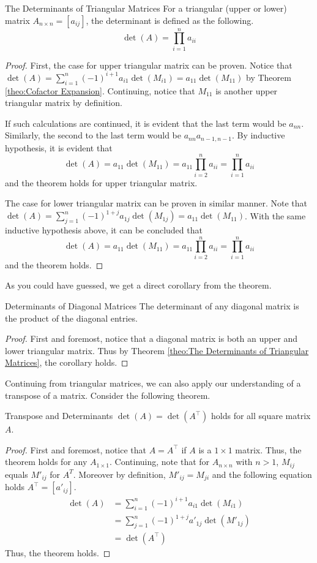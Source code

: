 \documentclass[../main.tex]{subfiles}
\begin{document}
\begin{theorem}{The Determinants of Triangular Matrices}
For a triangular (upper or lower) matrix $A_{n \times n} = [a_{ij}]$,
the determinant is defined as the following.
\[
\det(A)
= \prod_{i=1}^n a_{ii}
\]
\end{theorem}
\begin{proof}
First, the case for upper triangular matrix can be proven. Notice that
$\det(A) = \sum_{i=1}^n (-1)^{i + 1} a_{i1} \det(M_{i1}) =
a_{11} \det(M_{11})$ by Theorem \ref{theo:Cofactor Expansion}.
Continuing, notice that $M_{11}$ is another upper triangular matrix
by definition.

If such calculations are continued, it is evident that the last
term would be $a_{nn}$. Similarly, the second to the last term
would be $a_{nn} a_{n-1,n-1}$. By inductive hypothesis, it is
evident that
\[
\det(A)
= a_{11} \det(M_{11})
= a_{11} \prod_{i=2}^n a_{ii}
= \prod_{i=1}^n a_{ii}
\]
and the theorem holds for upper triangular matrix.

The case for lower triangular matrix can be proven in similar
manner. Note that $\det(A) = \sum_{j=1}^n (-1)^{1 + j} a_{1j}
\det(M_{1j}) = a_{11} \det(M_{11})$. With the same inductive
hypothesis above, it can be concluded that
\[
\det(A)
= a_{11} \det(M_{11})
= a_{11} \prod_{i=2}^n a_{ii}
= \prod_{i=1}^n a_{ii}
\]
and the theorem holds.
\end{proof}

As you could have guessed, we get a direct corollary from the
theorem.

\begin{corollary}{Determinants of Diagonal Matrices}
The determinant of any diagonal matrix is the product of the
diagonal entries.
\end{corollary}
\begin{proof}
First and foremost, notice that a diagonal matrix is both
an upper and lower triangular matrix. Thus by Theorem \ref{theo:The
Determinants of Triangular Matrices}, the corollary holds.
\end{proof}

Continuing from triangular matrices, we can also apply our
understanding of a transpose of a matrix. Consider the following
theorem.

\begin{theorem}{Transpose and Determinants}
$\det(A) = \det(A^\intercal)$ holds for all square matrix $A$.
\end{theorem}
\begin{proof}
First and foremost, notice that $A = A^\intercal$ if $A$ is a
$1 \times 1$ matrix. Thus, the theorem holds for any $A_{1 \times 1}$.
Continuing, note that for $A_{n \times n}$ with $n > 1$, $M_{ij}$
equals $M'_{ij}$ for $A^T$. Moreover by definition, $M'_{ij} =
M_{ji}$ and the following equation holds $A^\intercal = [a'_{ij}]$.
\begin{align*}
    \det(A)
    &= \sum_{i=1}^n (-1)^{i + 1} a_{i1} \det(M_{i1}) \\
    &= \sum_{j=1}^n (-1)^{1 + j} a'_{1j} \det(M'_{1j}) \\
    &= \det\left( A^\intercal \right)
\end{align*}
Thus, the theorem holds.
\end{proof}
\end{document}
